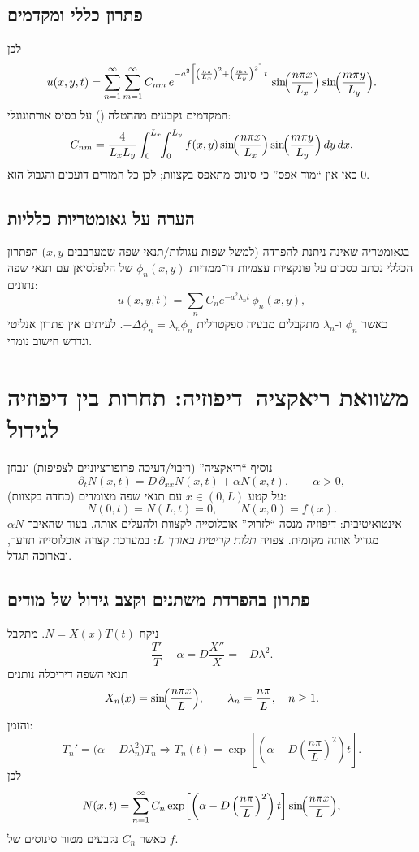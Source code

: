 \subsection{פתרון כללי ומקדמים}
לכן
\[
u(x,y,t)=\sum_{n=1}^\infty\sum_{m=1}^\infty
C_{nm}\,
e^{-a^2\left[\left(\frac{n\pi}{L_x}\right)^2+\left(\frac{m\pi}{L_y}\right)^2\right]t}\,
\sin\!\Bigl(\frac{n\pi x}{L_x}\Bigr)\sin\!\Bigl(\frac{m\pi y}{L_y}\Bigr).
\]
המקדמים נקבעים מההטלה () על בסיס אורתוגונלי:
\[
C_{nm}=\frac{4}{L_xL_y}\int_0^{L_x}\!\!\int_0^{L_y}
f(x,y)\sin\!\Bigl(\frac{n\pi x}{L_x}\Bigr)\sin\!\Bigl(\frac{m\pi y}{L_y}\Bigr)\,dy\,dx.
\]
כאן אין ``מוד אפס'' כי סינוס מתאפס בקצוות; לכן כל המודים דועכים והגבול הוא \(0\).

\subsection{הערה על גאומטריות כלליות}
בגאומטריה שאינה ניתנת להפרדה (למשל שפות עגולות/תנאי שפה שמערבבים \(x,y\)) הפתרון הכללי נכתב כסכום על פונקציות עצמיות דו־ממדיות \(\phi_n(x,y)\) של הלפלסיאן עם תנאי שפה נתונים:
\[
u(x,y,t)=\sum_{n} C_n e^{-a^2\lambda_n t}\,\phi_n(x,y),
\]
כאשר \(\phi_n\) ו-\(\lambda_n\) מתקבלים מבעיה ספקטרלית \(-\Delta \phi_n=\lambda_n \phi_n\).
לעיתים אין פתרון אנליטי ונדרש חישוב נומרי.

\section{משוואת ריאקציה–דיפוזיה: תחרות בין דיפוזיה לגידול}
נוסיף ``ריאקציה'' (ריבוי/דעיכה פרופורציוניים לצפיפות) ונבחן
\[
\partial_t N(x,t)=D\,\partial_{xx}N(x,t)+\alpha N(x,t),
\qquad \alpha>0,
\]
על קטע \(x\in(0,L)\) עם תנאי שפה מצומדים (כחדה בקצוות):
\[
N(0,t)=N(L,t)=0,\qquad N(x,0)=f(x).
\]
אינטואיטיבית:
דיפוזיה מנסה ``לזרוק'' אוכלוסייה לקצוות ולהעלים אותה, בעוד שהאיבר \(\alpha N\) מגדיל אותה מקומית.
צפויה \emph{תלות קריטית באורך} \(L\): במערכת קצרה אוכלוסייה תדעך, ובארוכה תגדל.

\subsection{פתרון בהפרדת משתנים וקצב גידול של מודים}
ניקח \(N=X(x)T(t)\). מתקבל
\[
\frac{T'}{T}-\alpha = D\frac{X''}{X}=-D\lambda^2.
\]
תנאי השפה דיריכלה נותנים
\[
X_n(x)=\sin\!\Bigl(\frac{n\pi x}{L}\Bigr),\qquad \lambda_n=\frac{n\pi}{L},\quad n\ge 1.
\]
והזמן:
\[
T_n'=\bigl(\alpha-D\lambda_n^2\bigr)T_n
\Rightarrow
T_n(t)=\exp\!\left[\left(\alpha-D\left(\frac{n\pi}{L}\right)^2\right)t\right].
\]
לכן
\[
N(x,t)=\sum_{n=1}^\infty C_n
\exp\!\left[\left(\alpha-D\left(\frac{n\pi}{L}\right)^2\right)t\right]
\sin\!\Bigl(\frac{n\pi x}{L}\Bigr),
\]
כאשר \(C_n\) נקבעים מטור סינוסים של \(f\).

